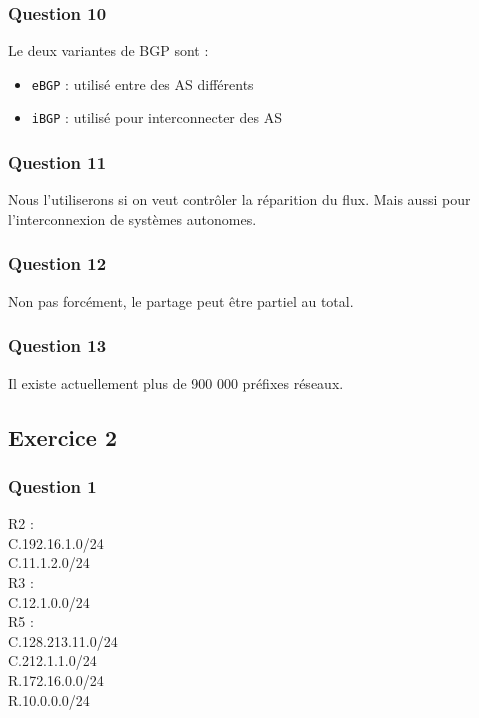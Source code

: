 \documentclass[12pt, a4paper]{article}
\begin{document}
    \subsubsection{Question 10}
    Le deux variantes de BGP sont :
    \begin{itemize}
        \item \texttt{eBGP} : utilisé entre des AS différents
        \item \texttt{iBGP} : utilisé pour interconnecter des AS
    \end{itemize}

    \subsubsection{Question 11}
    Nous l'utiliserons si on veut contrôler la réparition du flux. Mais aussi
    pour l'interconnexion de systèmes autonomes. 

    \subsubsection{Question 12}
    Non pas forcément, le partage peut être partiel au total. 

    \subsubsection{Question 13}
    Il existe actuellement plus de 900 000 préfixes réseaux. 

\subsection{Exercice 2}
    \subsubsection{Question 1}
    R2 : \\ 
    C.192.16.1.0/24\\
    C.11.1.2.0/24\\

    R3 : \\
    C.12.1.0.0/24\\

    R5 : \\
    C.128.213.11.0/24\\
    C.212.1.1.0/24\\
    R.172.16.0.0/24\\
    R.10.0.0.0/24\\
\end{document}
